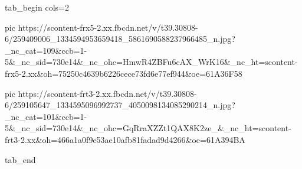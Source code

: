  
 
 
 
 


\ifcmt
  tab_begin cols=2

     pic https://scontent-frx5-2.xx.fbcdn.net/v/t39.30808-6/259409006_1334594953659418_5861690588237966485_n.jpg?_nc_cat=109&ccb=1-5&_nc_sid=730e14&_nc_ohc=HmwR4ZBFu6cAX_WrK16&_nc_ht=scontent-frx5-2.xx&oh=75250c4639b6226cece73fd6e77ef944&oe=61A36F58

     pic https://scontent-frt3-2.xx.fbcdn.net/v/t39.30808-6/259105647_1334595096992737_4050098134085290214_n.jpg?_nc_cat=101&ccb=1-5&_nc_sid=730e14&_nc_ohc=GqRraXZZt1QAX8K2ze_&_nc_ht=scontent-frt3-2.xx&oh=466a1a0f9e53ae10afb81fadad9d4266&oe=61A394BA

  tab_end
\fi
